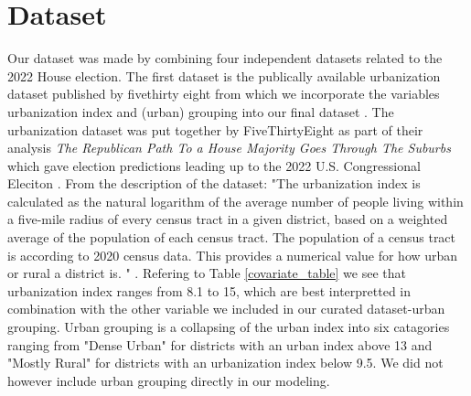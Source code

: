 \documentclass[12pt]{article}
\newcommand{\red}[1]{\textcolor{red}{#1}}
\newcommand{\blue}[1]{\textcolor{blue}{#1}}
\begin{document}







\section{Dataset}
Our dataset was made by combining four independent datasets related to the 2022 House election. The first dataset is the publically available urbanization dataset published by fivethirty eight from which we incorporate the variables urbanization index  and (urban) grouping into our final dataset \cite{urbanizationdataset}. The urbanization dataset was put together by FiveThirtyEight as part of their analysis  \textit{The Republican Path To a House Majority Goes Through The Suburbs} which gave election predictions leading up to the 2022 U.S. Congressional Eleciton \cite{538urbanizationarticle}. From the description of the dataset: "The urbanization index is calculated as the natural logarithm of the average number of people living within a five-mile radius of every census tract in a given district, based on a weighted average of the population of each census tract. The population of a census tract is according to 2020 census data. This provides a numerical value for how urban or rural a district is. " \cite{urbanizationdataset}. Refering to Table \ref{covariate_table} we see that urbanization index ranges from 8.1 to 15, which are best interpretted in combination with the other variable we included in our curated dataset-urban grouping. Urban grouping is a collapsing of the urban index into six catagories ranging from "Dense Urban" for districts with an urban index above 13 and "Mostly Rural" for districts with an urbanization index below 9.5. We did not however include urban grouping directly in our modeling.
\end{document}
